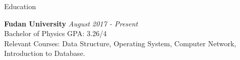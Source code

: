 \documentclass{resume} %
\begin{document}
\begin{rSection}{Education}

{\bf Fudan University} \hfill {\em August 2017 - Present} 
\\ Bachelor of Physics \hfill { GPA: 3.26/4}
\\ Relevant Courses: Data Structure, Operating System, Computer Network, Introduction to Database.

\end{rSection}


\end{document}
